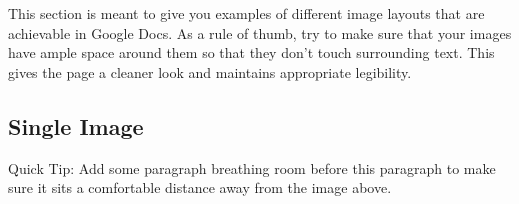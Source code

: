 \documentclass[notitlepage]{nyu22report}
\begin{document}
This section is meant to give you examples of different image layouts that are
achievable in Google Docs. As a rule of thumb, try to make sure that your images
have ample space around them so that they don’t touch surrounding text. This
gives the page a cleaner look and maintains appropriate legibility.

\subsection*{Single Image}

Quick Tip: Add some paragraph breathing room before this paragraph to make sure
it sits a comfortable distance away from the image above. 
\end{document}
